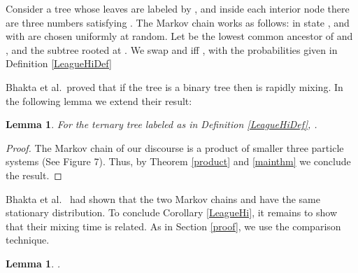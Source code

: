 \documentclass[10 pt]{article}
\newtheorem{lemma}[thm]{Lemma}
\begin{document}
Consider a tree whose leaves are labeled by , and inside each interior node  there are three numbers 
satisfying . The Markov chain  works as follows:
in state ,  and  with  are chosen uniformly at random. Let  be the lowest common ancestor
of  and , and   the subtree rooted at . We swap  and  iff ,
with the probabilities given in Definition \ref{LeagueHiDef}
 
Bhakta et al.\ proved that if the tree is a binary tree then  is rapidly mixing. In the following lemma we extend their result:  
 
\begin{lemma} For the ternary tree labeled as in Definition \ref{LeagueHiDef}, .
 
\end{lemma}
 
 

\begin{proof}
The  Markov chain of our discourse is a product of  smaller three particle systems (See Figure 7). Thus, by
Theorem \ref{product} and \ref{mainthm} we conclude the result. 
\end{proof}
 


Bhakta et al.\ \cite{Dana} had shown that the two Markov chains  and  have the same stationary distribution.
To conclude  Corollary \ref{LeagueHi}, it remains to show that their mixing time is related. As in Section \ref{proof}, we use the comparison technique. 


\begin{lemma}
.
\end{lemma}
\end{document}

